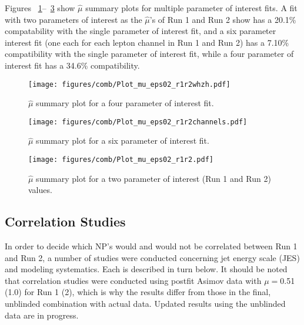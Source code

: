 Figures ~\ref{fig:combmushat4}--~\ref{fig:combmushat6} show $\hat{\mu}$ summary plots for multiple parameter of interest fits.  A fit with two parameters of interest as the $\hat{\mu}$'s of Run 1 and Run 2 show has a 20.1\% compatability with the single parameter of interest fit, and a six parameter interest fit (one each for each lepton channel in Run 1 and Run 2) has a 7.10\% compatibility with the single parameter of interest fit, while a four parameter of interest fit has a 34.6\% compatibility.


\begin{figure}[!htbp]\captionsetup{justification=centering}
  \begin{center}
  \texttt{[image: figures/comb/Plot\_mu\_eps02\_r1r2whzh.pdf]}
  \caption{$\hat{\mu}$ summary plot for a four parameter of interest fit.}
  \label{fig:combmushat4}
  \end{center}
\end{figure}

\begin{figure}[!htbp]\captionsetup{justification=centering}
  \begin{center}
  \texttt{[image: figures/comb/Plot\_mu\_eps02\_r1r2channels.pdf]}
  \caption{$\hat{\mu}$ summary plot for a six parameter of interest fit.}
  \label{fig:combmushat5}
  \end{center}
\end{figure}

\begin{figure}[!htbp]\captionsetup{justification=centering}
  \begin{center}
  \texttt{[image: figures/comb/Plot\_mu\_eps02\_r1r2.pdf]}
  \caption{$\hat{\mu}$ summary plot for a two parameter of interest (Run 1 and Run 2) values.}
  \label{fig:combmushat6}
  \end{center}
\end{figure}


\subsection{Correlation Studies}
In order to decide which NP's would and would not be correlated between Run 1 and Run 2, a number of studies were conducted concerning jet energy scale (JES) and modeling systematics.  Each is described in turn below.  It should be noted that correlation studies were conducted using postfit Asimov data with $\mu=$0.51 (1.0) for Run 1 (2), which is why the results differ from those in the final, unblinded combination with actual data.  Updated results using the unblinded data are in progress.

